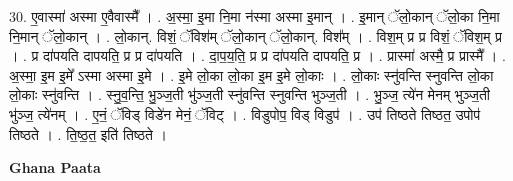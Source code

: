 \documentclass[17pt]{extarticle}
\begin{document}
30. ए॒वास्मा॑ अस्मा ए॒वैवास्मै᳚ । . अ॒स्मा॒ इ॒मा नि॒मा न॑स्मा अस्मा इ॒मान् । . इ॒मान् ॅलो॒कान् ॅलो॒का नि॒मा नि॒मान् ॅलो॒कान् । . लो॒कान्. विशं॒ ॅविश॑म् ॅलो॒कान् ॅलो॒कान्. विश᳚म् । . विश॒म् प्र प्र विशं॒ ॅविश॒म् प्र । . प्र दा॑पयति दापयति॒ प्र प्र दा॑पयति । . दा॒प॒य॒ति॒ प्र प्र दा॑पयति दापयति॒ प्र । . प्रास्मा॑ अस्मै॒ प्र प्रास्मै᳚ । . अ॒स्मा॒ इ॒म इ॒मे᳚ ऽस्मा अस्मा इ॒मे । . इ॒मे लो॒का लो॒का इ॒म इ॒मे लो॒काः । . लो॒काः स्नु॑वन्ति स्नुवन्ति लो॒का लो॒काः स्नु॑वन्ति । . स्नु॒व॒न्ति॒ भु॒ञ्ज॒ती भु॑ञ्ज॒ती स्नु॑वन्ति स्नुवन्ति भुञ्ज॒ती । . भु॒ञ्ज॒ त्ये॑न मेनम् भुञ्ज॒ती भु॑ञ्ज॒ त्ये॑नम् । . ए॒नं॒ ॅविड् विडे॑न मेनं॒ ॅविट् । . विडुपोप॒ विड् विडुप॑ । . उप॑ तिष्ठते तिष्ठत॒ उपोप॑ तिष्ठते । . ति॒ष्ठ॒त॒ इति॑ तिष्ठते । \newline

\textbf{Ghana Paata } \newline
\end{document}
